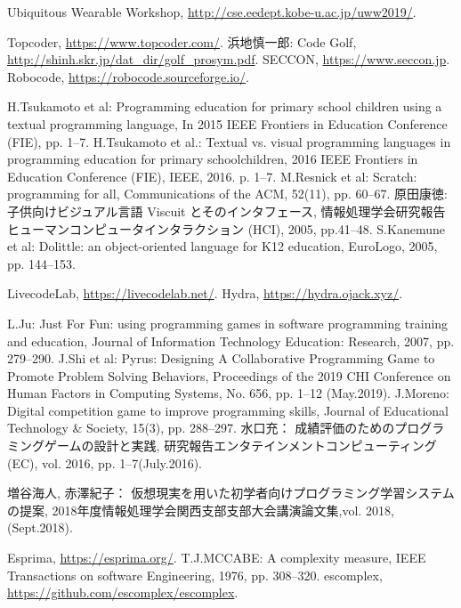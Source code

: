 \begin{thebibliography}{99}
	Ubiquitous Wearable Workshop, \url{http://cse.eedept.kobe-u.ac.jp/uww2019/}.


	Topcoder, \url{https://www.topcoder.com/}.
	浜地慎一郎: Code Golf, \url{http://shinh.skr.jp/dat_dir/golf_prosym.pdf}.
	SECCON, \url{https://www.seccon.jp}.
	Robocode, \url{https://robocode.sourceforge.io/}.

	H.Tsukamoto et al: Programming education for primary school children using a textual programming language, In 2015 IEEE Frontiers in Education Conference (FIE), pp. 1--7.
	H.Tsukamoto et al.: Textual vs. visual programming languages in programming education for primary schoolchildren, 2016 IEEE Frontiers in Education Conference (FIE), IEEE, 2016. p. 1--7.
	M.Resnick et al: Scratch: programming for all, Communications of the ACM, 52(11), pp. 60--67.
	原田康徳: 子供向けビジュアル言語 Viscuit とそのインタフェース, 情報処理学会研究報告ヒューマンコンピュータインタラクション (HCI), 2005, pp.41--48.
	S.Kanemune et al: Dolittle: an object-oriented language for K12 education, EuroLogo, 2005, pp. 144--153.

	LivecodeLab, \url{https://livecodelab.net/}.
	Hydra, \url{https://hydra.ojack.xyz/}.

	L.Ju: Just For Fun: using programming games in software programming training and education, Journal of Information Technology Education: Research, 2007, pp. 279--290.
	J.Shi et al: Pyrus: Designing A Collaborative Programming Game to Promote Problem Solving Behaviors, Proceedings of the 2019 CHI Conference on Human Factors in Computing Systems, No. 656, pp. 1–12 (May.2019).
	J.Moreno: Digital competition game to improve programming skills, Journal of Educational Technology \& Society, 15(3), pp. 288--297.
	水口充： 成績評価のためのプログラミングゲームの設計と実践, 研究報告エンタテインメントコンピューティング(EC), vol. 2016, pp. 1–7(July.2016).

	増谷海人, 赤澤紀子： 仮想現実を用いた初学者向けプログラミング学習システムの提案, 2018年度情報処理学会関西支部支部大会講演論文集,vol. 2018, (Sept.2018).

	Esprima, \url{https://esprima.org/}.
	 T.J.MCCABE: A complexity measure, IEEE Transactions on software Engineering, 1976, pp. 308--320.
	escomplex, \url{https://github.com/escomplex/escomplex}.

\end{thebibliography}
